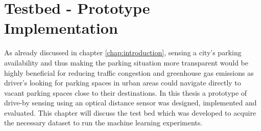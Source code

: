 \chapter{Testbed - Prototype Implementation}
\label{chap:referenceimplementation}

As already discussed in chapter \ref{chap:introduction}, sensing a city's parking availability and thus making the parking situation more transparent would be highly beneficial for reducing traffic congestion and greenhouse gas emissions as driver's looking for parking spaces in urban areas could navigate directly to vacant parking spaces close to their destinations. In this thesis a prototype of drive-by sensing using an optical distance sensor was designed, implemented and evaluated. This chapter will discuss the test bed which was developed to acquire the necessary dataset to run the machine learning experiments.







